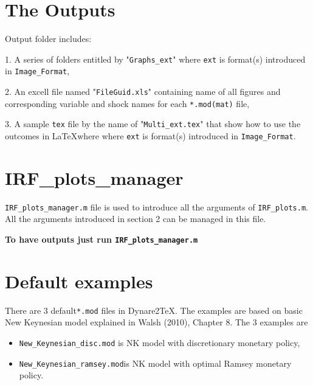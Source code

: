 \documentclass[11pt,a4paper]{article}
\begin{document}
\section{The Outputs}
Output folder includes:

1. A series of folders entitled by "\texttt{Graphs\_ext}" where \texttt{ext} is format(s) introduced in \texttt{Image_Format},

2. An excell file named "\texttt{FileGuid.xls}" containing name of all figures
and corresponding variable and shock names for each \texttt{*.mod(mat)} file,

3. A sample \texttt{tex} file by the name of "\texttt{Multi\_ext.tex}" that show how to use the outcomes in \LaTeX where where \texttt{ext} is format(s) introduced in \texttt{Image_Format}.

\section{IRF\_plots\_manager}
\texttt{IRF\_plots\_manager.m} file is used to introduce all the arguments of \texttt{IRF_plots.m}. All the arguments introduced in section 2 can be managed in this file. 

{\bf To have outputs just run \texttt{IRF\_plots\_manager.m}} 

\section{Default examples}
There are 3 default\texttt{*.mod} files in Dynare2TeX. The examples are based on basic New Keynesian model explained in Walsh (2010), Chapter 8. The 3 examples are
\begin{itemize}
\item \texttt{New_Keynesian_disc.mod} is NK model  with discretionary monetary policy,
\item \texttt{New_Keynesian_ramsey.mod}is NK model with optimal Ramsey monetary policy.
\end{itemize}
\end{document}
